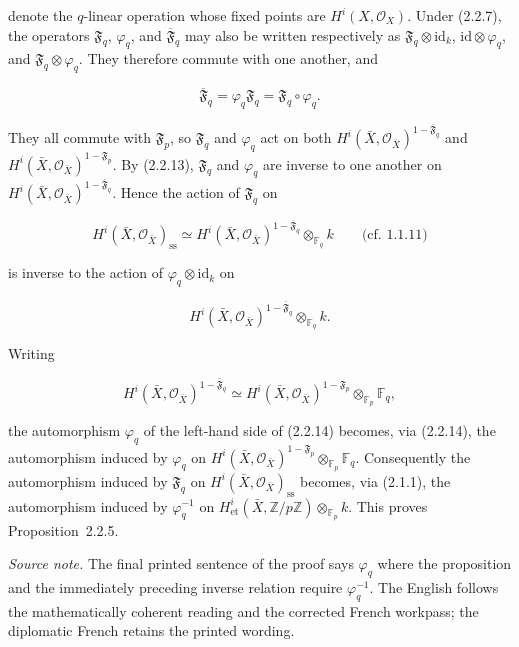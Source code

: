 denote the $q$-linear operation whose fixed points are
$H^i(X,\mathcal O_X)$. Under (2.2.7), the operators
$\mathfrak F_q$, $\varphi_q$, and $\overline{\mathfrak F}_q$ may also be
written respectively as
$\mathfrak F_q\otimes\mathrm{id}_k$,
$\mathrm{id}\otimes\varphi_q$, and
$\mathfrak F_q\otimes\varphi_q$. They therefore commute with one another,
and

\begin{equation}\tag{2.2.13}
\overline{\mathfrak F}_q
=\varphi_q\mathfrak F_q
=\mathfrak F_q\circ\varphi_q.
\end{equation}

They all commute with $\mathfrak F_p$, so $\mathfrak F_q$ and $\varphi_q$
act on both
$H^i(\bar X,\mathcal O_{\bar X})^{1-\overline{\mathfrak F}_q}$ and
$H^i(\bar X,\mathcal O_{\bar X})^{1-\mathfrak F_p}$. By (2.2.13),
$\mathfrak F_q$ and $\varphi_q$ are inverse to one another on
$H^i(\bar X,\mathcal O_{\bar X})^{1-\overline{\mathfrak F}_q}$. Hence the
action of $\mathfrak F_q$ on

\[
H^i(\bar X,\mathcal O_{\bar X})_{\mathrm{ss}}
\simeq
H^i(\bar X,\mathcal O_{\bar X})^{1-\overline{\mathfrak F}_q}
\otimes_{\mathbb F_q}k
\qquad\text{(cf. 1.1.11)}
\]

is inverse to the action of $\varphi_q\otimes\mathrm{id}_k$ on

\[
H^i(\bar X,\mathcal O_{\bar X})^{1-\overline{\mathfrak F}_q}
\otimes_{\mathbb F_q}k.
\]

Writing

\begin{equation}\tag{2.2.14}
H^i(\bar X,\mathcal O_{\bar X})^{1-\overline{\mathfrak F}_q}
\simeq
H^i(\bar X,\mathcal O_{\bar X})^{1-\mathfrak F_p}
\otimes_{\mathbb F_p}\mathbb F_q,
\end{equation}

the automorphism $\varphi_q$ of the left-hand side of (2.2.14) becomes,
via (2.2.14), the automorphism induced by $\varphi_q$ on
$H^i(\bar X,\mathcal O_{\bar X})^{1-\mathfrak F_p}
\otimes_{\mathbb F_p}\mathbb F_q$. Consequently the automorphism induced by
$\mathfrak F_q$ on
$H^i(\bar X,\mathcal O_{\bar X})_{\mathrm{ss}}$ becomes, via (2.1.1), the
automorphism induced by $\varphi_q^{-1}$ on
$H^i_{\mathrm{et}}(\bar X,\mathbb Z/p\mathbb Z)
\otimes_{\mathbb F_p}k$. This proves Proposition~2.2.5.

\medskip
\noindent\emph{Source note.}
The final printed sentence of the proof says $\varphi_q$ where the proposition
and the immediately preceding inverse relation require $\varphi_q^{-1}$.
The English follows the mathematically coherent reading and the corrected
French workpass; the diplomatic French retains the printed wording.
